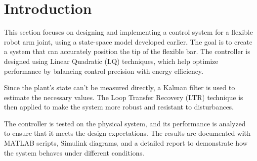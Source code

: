 \section*{Introduction}
\label{sec:intro}

This section focuses on designing and implementing a control system for a flexible robot arm joint, using a state-space model developed earlier. The goal is to create a system that can accurately position the tip of the flexible bar. The controller is designed using Linear Quadratic (LQ) techniques, which help optimize performance by balancing control precision with energy efficiency.

Since the plant's state can’t be measured directly, a Kalman filter is used to estimate the necessary values. The Loop Transfer Recovery (LTR) technique is then applied to make the system more robust and resistant to disturbances.

The controller is tested on the physical system, and its performance is analyzed to ensure that it meets the design expectations. The results are documented with MATLAB scripts, Simulink diagrams, and a detailed report to demonstrate how the system behaves under different conditions.